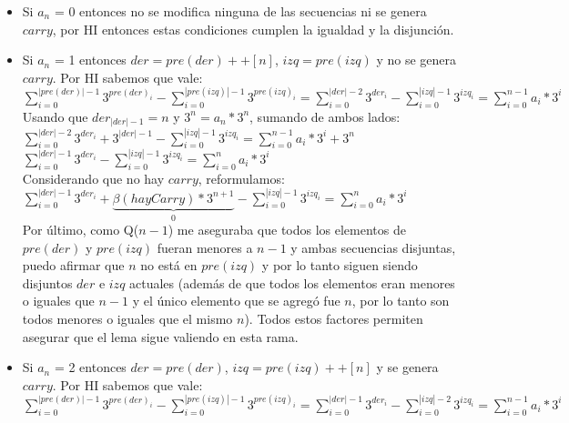 	\begin{itemize}
	\item Si $a_n$ = 0 entonces no se modifica ninguna de las secuencias ni se genera $carry$, por HI entonces estas condiciones cumplen la igualdad y la disjunción.
	\item Si $a_n$ = 1 entonces $der = pre(der)++[n] $, $izq = pre(izq)$ y no se genera $carry$. Por HI sabemos que vale:
	\\

	$\sum_{i=0}^{|pre(der)|-1} 3^{pre(der)_i} - \sum_{i=0}^{|pre(izq)|-1} 3^{pre(izq)_i} = \sum_{i=0}^{|der|-2} 3^{der_i} - \sum_{i=0}^{|izq|-1} 3^{izq_i} = \sum_{i=0}^{n-1} a_i*3^{i}$
	\\

	Usando que $der_{|der|-1} = n$ y $ 3^{n} = a_{n}*3^{n}$, sumando de ambos lados:
	\\

	$\sum_{i=0}^{|der|-2} 3^{der_i} + 3^{|der|-1} - \sum_{i=0}^{|izq|-1} 3^{izq_i} = \sum_{i=0}^{n-1} a_i*3^{i} + 3^{n} $
	\\

	$\sum_{i=0}^{|der|-1} 3^{der_i} - \sum_{i=0}^{|izq|-1} 3^{izq_i} = \sum_{i=0}^{n} a_i*3^{i}$
	\\

	Considerando que no hay $carry$, reformulamos: \\

	$\sum_{i=0}^{|der|-1} 3^{der_i} + \underbrace{\beta(hayCarry)*3^{n+1}}_\text{0} - \sum_{i=0}^{|izq|-1} 3^{izq_i} = \sum_{i=0}^{n} a_i*3^{i} $
	\\

	Por último, como Q($n-1$) me aseguraba que todos los elementos de $pre(der)$ y $pre(izq)$ fueran menores a $n-1$ y ambas secuencias disjuntas, puedo afirmar que $n$ no está en $pre(izq)$ y por lo tanto siguen siendo disjuntos $der$ e $izq$ actuales (además de que todos los elementos eran menores o iguales que $n-1$ y el único elemento que se agregó fue $n$, por lo tanto son todos menores o iguales que el mismo $n$). Todos estos factores permiten asegurar que el lema sigue valiendo en esta rama.

	\item Si $a_n$ = 2 entonces $der = pre(der)$, $izq = pre(izq)++[n]$ y se genera $carry$. Por HI sabemos que vale:
	\\

	$\sum_{i=0}^{|pre(der)|-1} 3^{pre(der)_i} - \sum_{i=0}^{|pre(izq)|-1} 3^{pre(izq)_i} = \sum_{i=0}^{|der|-1} 3^{der_i} - \sum_{i=0}^{|izq|-2} 3^{izq_i} = \sum_{i=0}^{n-1} a_i*3^{i} $
	\\


\end{itemize}
